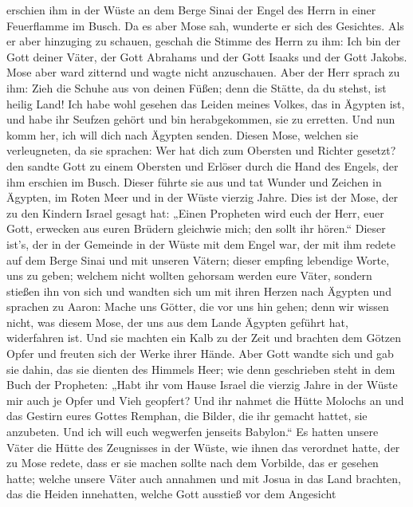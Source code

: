 erschien ihm in der Wüste an dem Berge Sinai der Engel des Herrn in
einer Feuerflamme im Busch.  Da es aber Mose sah, wunderte
er sich des Gesichtes. Als er aber hinzuging zu schauen, geschah die
Stimme des Herrn zu ihm:  Ich bin der Gott deiner Väter,
der Gott Abrahams und der Gott Isaaks und der Gott Jakobs. Mose aber
ward zitternd und wagte nicht anzuschauen.  Aber der Herr
sprach zu ihm: Zieh die Schuhe aus von deinen Füßen; denn die Stätte, da
du stehst, ist heilig Land!  Ich habe wohl gesehen das
Leiden meines Volkes, das in Ägypten ist, und habe ihr Seufzen gehört
und bin herabgekommen, sie zu erretten. Und nun komm her, ich will dich
nach Ägypten senden.  Diesen Mose, welchen sie
verleugneten, da sie sprachen: Wer hat dich zum Obersten und Richter
gesetzt? den sandte Gott zu einem Obersten und Erlöser durch die Hand
des Engels, der ihm erschien im Busch.  Dieser führte sie
aus und tat Wunder und Zeichen in Ägypten, im Roten Meer und in der
Wüste vierzig Jahre.  Dies ist der Mose, der zu den Kindern
Israel gesagt hat: „Einen Propheten wird euch der Herr, euer Gott,
erwecken aus euren Brüdern gleichwie mich; den sollt ihr hören.``
 Dieser ist's, der in der Gemeinde in der Wüste mit dem
Engel war, der mit ihm redete auf dem Berge Sinai und mit unseren
Vätern; dieser empfing lebendige Worte, uns zu geben; 
welchem nicht wollten gehorsam werden eure Väter, sondern stießen ihn
von sich und wandten sich um mit ihren Herzen nach Ägypten 
und sprachen zu Aaron: Mache uns Götter, die vor uns hin gehen; denn wir
wissen nicht, was diesem Mose, der uns aus dem Lande Ägypten geführt
hat, widerfahren ist.  Und sie machten ein Kalb zu der Zeit
und brachten dem Götzen Opfer und freuten sich der Werke ihrer Hände.
 Aber Gott wandte sich und gab sie dahin, das sie dienten
des Himmels Heer; wie denn geschrieben steht in dem Buch der Propheten:
„Habt ihr vom Hause Israel die vierzig Jahre in der Wüste mir auch je
Opfer und Vieh geopfert?  Und ihr nahmet die Hütte Molochs
an und das Gestirn eures Gottes Remphan, die Bilder, die ihr gemacht
hattet, sie anzubeten. Und ich will euch wegwerfen jenseits Babylon.``
 Es hatten unsere Väter die Hütte des Zeugnisses in der
Wüste, wie ihnen das verordnet hatte, der zu Mose redete, dass er sie
machen sollte nach dem Vorbilde, das er gesehen hatte; 
welche unsere Väter auch annahmen und mit Josua in das Land brachten,
das die Heiden innehatten, welche Gott ausstieß vor dem Angesicht
